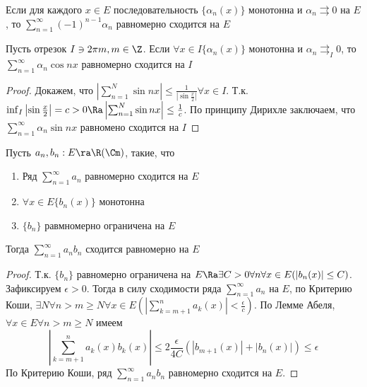 \begin{corollary}
    Если для каждого \(x \in E\) последовательность \(\{\alpha_n(x)\}\) монотонна и \(\alpha_n \rightrightarrows 0\) на \(E\), то \(\sum_{n = 1}^\infty (-1)^{n - 1}\alpha_n\) равномерно сходится на \(E\)
\end{corollary}
\begin{corollary}
    Пусть отрезок \(I \ni 2\pi m, m \in \Z\). Если \(\forall x \in I \{\alpha_n(x)\}\) монотонна и \(\alpha_n \rightrightarrows_I 0\), то \(\sum_{n = 1}^\infty \alpha_n\cos nx\) равномерно сходится на \(I\)
\end{corollary}
\begin{proof}
    Докажем, что \(\left|\sum_{n = 1}^N \sin nx\right| \le \frac{1}{\left|\sin \frac{x}{2}\right|} \forall x \in I\). Т.к. \(\inf_I \left|\sin \frac{x}{2}\right| = c > 0 \Ra \left|\sum_{n = 1}^N \sin nx\right| \le \frac{1}{c}\). По принципу Дирихле заключаем, что \(\sum_{n = 1}^\infty \alpha_n \sin nx\) равномено сходится на \(I\)
\end{proof}

\begin{theorem}
    Пусть \(a_n, b_n: E \ra \R (\Cm)\), такие, что
    \begin{enumerate}
        \item Ряд \(\sum_{n = 1}^\infty a_n\) равномерно сходится на \(E\)
        \item \(\forall x \in E \{b_n(x)\}\) монотонна
        \item \(\{b_n\}\) равмномерно ограничена на \(E\)
    \end{enumerate}
    Тогда \(\sum_{n = 1}^\infty a_nb_n\) сходится равномерно на \(E\)
\end{theorem}
\begin{proof}
    Т.к. \(\{b_n\}\) равномерно ограничена на \(E \Ra \exists C > 0 \forall n \forall x \in E (|b_n(x)| \le C)\). Зафиксируем \(\epsilon > 0\). Тогда в силу сходимости ряда \(\sum_{n = 1}^\infty a_n\) на \(E\), по Критерию Коши, \(\exists N \forall n > m \ge N \forall x \in E \left(\left|\sum_{k = m + 1}^n a_k(x)\right| < \frac{\epsilon}{c}\right)\). По Лемме Абеля, \(\forall x \in E \forall n > m \ge N\) имеем 
    \[\left|\sum_{k = m + 1}^n a_k(x)b_k(x)\right| \le 2\frac{\epsilon}{4C}\left(|b_{m + 1}(x)| + |b_n(x)|\right) \le \epsilon\]
    По Критерию Коши, ряд \(\sum_{n = 1}^\infty a_nb_n\) равномерно сходится на \(E\).
\end{proof}

